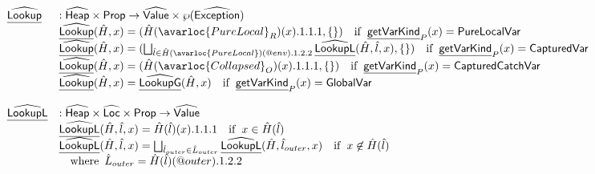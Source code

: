 \[
\begin{array}{ll}

\ahf{Lookup} & : \aHeap \times \SF{Prop} \rightarrow \aValue \times \powerset{\abs{Exception}}\\
& \ahf{Lookup}(\hat{H},x) = (\hat{H}(\avarloc{PureLocal}_R)(x).1.1.1, \set{ }) 
      \quad\ifc{\chf{getVarKind}_P(x) = \SF{PureLocalVar}} \\
& \ahf{Lookup}(\hat{H},x) = (\bigsqcup_{\hat{l}\in\hat{H}(\avarloc{PureLocal})(\varprop{env}).1.2.2} \ahf{LookupL}(\hat{H},\hat{l},x), \set{ })
      \quad\ifc{\chf{getVarKind}_P(x) = \SF{CapturedVar}} \\
& \ahf{Lookup}(\hat{H},x) = (\hat{H}(\avarloc{Collapsed}_O)(x).1.1.1, \set{ }) 
      \quad\ifc{\chf{getVarKind}_P(x) = \SF{CapturedCatchVar}} \\
& \ahf{Lookup}(\hat{H},x) = \ahf{LookupG}(\hat{H},x)
      \quad\ifc{\chf{getVarKind}_P(x) = \SF{GlobalVar}} \\
\\

\ahf{LookupL} & : \aHeap \times \aLoc \times \SF{Prop} \rightarrow \aValue \\
& \ahf{LookupL}(\hat{H}, \hat{l}, x) = \hat{H}(\hat{l})(x).1.1.1 \quad\ifc{x \in \hat{H}(\hat{l})}\\
& \ahf{LookupL}(\hat{H}, \hat{l}, x) = \bigsqcup_{\hat{l}_{outer}\in\hat{L}_{outer}}\ahf{LookupL}(\hat{H}, \hat{l}_{outer}, x)
    \quad\ifc{x \not\in \hat{H}(\hat{l})} \\
&   \quad\wherec{\hat{L}_{outer} = \hat{H}(\hat{l})(\varprop{outer}).1.2.2} \\
\\


\end{array}\]
